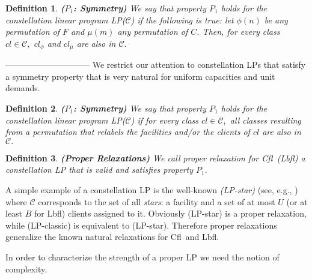 \documentclass[11pt]{article}
\newtheorem{definition}{Definition}[section]
\newcommand{\lbfl}{{\sc Lbfl}}
\newcommand{\cfl}{{\sc Cfl}}
\begin{document}
\begin{definition} {\bf ($P_1$: Symmetry)} \label{def:symmetry}
We  say  that property  $P_1$  holds for the constellation linear program LP($\mathcal{C}$)   if  the
following is  true: let $\phi  (n)$ be any  permutation of $F$  and $\mu
(m)$ any permutation of $C$.
 Then, for every  class $cl \in \mathcal{C},$  $cl_{\phi}$ 
and $cl_{\mu}$ are also in $\mathcal{C}.$
\end{definition}
\vspace*{-0.6cm}

------------------------------ \fi 
We  restrict our attention to  constellation LPs that satisfy a
symmetry property that is very natural for uniform capacities and unit
demands. 

\vspace*{-0.1cm}
\begin{definition} {\bf ($P_1$: Symmetry)} \label{def:symmetry}
We  say  that property  $P_1$  holds for the constellation linear program LP($\mathcal{C}$)   if  
 for every  class $cl \in \mathcal{C},$  all classes resulting from
 a  permutation that relabels the facilities and/or the clients of
 $cl$ are
 also in $\mathcal{C}.$
\end{definition}
\vspace*{-0.3cm}



\begin{definition}  {\bf (Proper Relaxations)}  \label{def:proper} 
We call {\em proper relaxation}  for \cfl\ (\lbfl\/)  a constellation LP
 that is valid and satisfies property $P_1.$ 
\end{definition}
\vspace*{-0.1cm}


\noindent 
 A simple  example of a constellation LP is the well-known {\em
  (LP-star)}  (see, e.g., \cite{JainMMSV03}) where $\mathcal{C}$
corresponds to the set of all  {\em stars}: 
a facility and a set of at most $U$ (or at least $B$ for \lbfl) clients assigned to
it.
Obviously (LP-star) is a proper relaxation, while (LP-classic) is equivalent to
(LP-star). Therefore proper relaxations generalize the known natural
relaxations for \cfl\ and \lbfl. 
\begin{comment}
Our  result on proper relaxations is that  proper LPs that  are not ``complex'' enough have an unbounded integrality gap while those  that
are sufficiently ``complex'' have an integrality gap of $1.$  To that end, we
define  the complexity  of  a  proper LP. 
\end{comment}
In order to  characterize the strength of a proper LP we need  the notion of
complexity.  
\iffalse
Furthermore, for each  such facility  $i$ we  denote by
$C_{cl}(i)$ the  set of clients  $j$ for which  there is a facility  $i$ so
that $x_{ij}=1$ in $(y,x)_{cl}$.
\fi 
\end{document}
